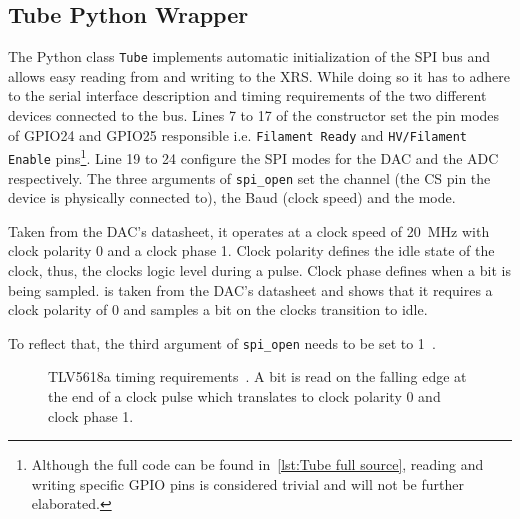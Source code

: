         \subsection{Tube Python Wrapper}
            The Python class \texttt{Tube} implements automatic initialization of the SPI bus and allows easy reading from and writing to the XRS.
            While doing so it has to adhere to the serial interface description and timing requirements of the two different devices connected to the bus.
            Lines \num{7} to \num{17} of the constructor set the pin modes of GPIO24 and GPIO25 responsible i.e. \texttt{Filament Ready} and \texttt{HV/Filament Enable} pins\footnote{Although the full code can be found in~\cref{lst:Tube full source}, reading and writing specific GPIO pins is considered trivial and will not be further elaborated.}.
            Line \num{19} to \num{24} configure the SPI modes for the DAC and the ADC respectively.
            The three arguments of \texttt{spi\_open} set the channel (the CS pin the device is physically connected to), the Baud (clock speed) and the mode.\par\medskip

            Taken from the DAC's datasheet, it operates at a clock speed of \qty{20}{\mega\hertz} with clock polarity 0 and a clock phase 1.
            Clock polarity defines the idle state of the clock, thus, the clocks logic level during a pulse.
            Clock phase defines when a bit is being sampled.
             is taken from the DAC's datasheet and shows that it requires a clock polarity of 0 and samples a bit on the clocks transition to idle.
            
            To reflect that, the third argument of \texttt{spi\_open} needs to be set to 1~\cite{Manual.PigpioLibrary}.
            \begin{figure}[h]
                \centering
                
                \caption[TLV5618a timing requirements]{TLV5618a timing requirements~\cite{Manual.DAC.TLV5618A}. A bit is read on the falling edge at the end of a clock pulse which translates to clock polarity 0 and clock phase 1.}
                \label{fig:tlv5618a timing req}
            \end{figure}

